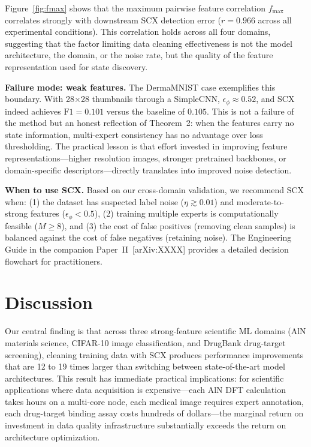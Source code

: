 Figure~\ref{fig:fmax} shows that the maximum pairwise feature correlation $f_{\max}$ correlates strongly with downstream SCX detection error ($r = 0.966$ across all experimental conditions). This correlation holds across all four domains, suggesting that the factor limiting data cleaning effectiveness is not the model architecture, the domain, or the noise rate, but the quality of the feature representation used for state discovery.

\textbf{Failure mode: weak features.} The DermaMNIST case exemplifies this boundary. With 28$\times$28 thumbnails through a SimpleCNN, $\epsilon_\phi \approx 0.52$, and SCX indeed achieves $\mathrm{F1} = 0.101$ versus the baseline of $0.105$. This is not a failure of the method but an honest reflection of Theorem~2: when the features carry no state information, multi-expert consistency has no advantage over loss thresholding. The practical lesson is that effort invested in improving feature representations---higher resolution images, stronger pretrained backbones, or domain-specific descriptors---directly translates into improved noise detection.

\textbf{When to use SCX.} Based on our cross-domain validation, we recommend SCX when: (1) the dataset has suspected label noise ($\eta \gtrsim 0.01$) and moderate-to-strong features ($\epsilon_\phi < 0.5$), (2) training multiple experts is computationally feasible ($M \geq 8$), and (3) the cost of false positives (removing clean samples) is balanced against the cost of false negatives (retaining noise). The Engineering Guide in the companion Paper~II~[arXiv:XXXX] provides a detailed decision flowchart for practitioners.

\section{Discussion}

Our central finding is that across three strong-feature scientific ML domains (AlN materials science, CIFAR-10 image classification, and DrugBank drug-target screening), cleaning training data with SCX produces performance improvements that are 12 to 19 times larger than switching between state-of-the-art model architectures. This result has immediate practical implications: for scientific applications where data acquisition is expensive---each AlN DFT calculation takes hours on a multi-core node, each medical image requires expert annotation, each drug-target binding assay costs hundreds of dollars---the marginal return on investment in data quality infrastructure substantially exceeds the return on architecture optimization.

